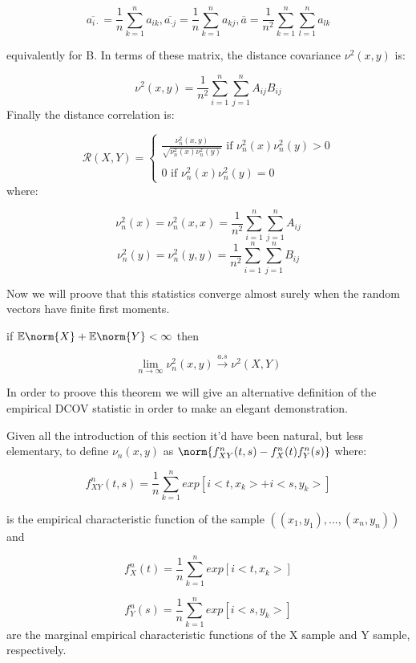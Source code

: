 $$\overline{a_{i\cdot}} = \frac{1}{n}\sum_{k=1}^{n}a_{ik},\overline{a_{\cdot j}} = \frac{1}{n}\sum_{k=1}^{n}a_{kj}, \overline{a} =  \frac{1}{n^{2}}\sum_{k=1}^{n}\sum_{l=1}^{n}a_{lk}$$

equivalently for B. In terms of these matrix, the distance covariance $\nu^{2}(x,y)$ is:

$$\nu^{2}(x,y) = \frac{1}{n^{2}}\sum_{i=1}^{n}\sum_{j=1}^{n}A_{ij}B_{ij}$$
Finally the distance correlation is:

$$
\mathcal{R}(X,Y) = \left \{
	\begin{array}{c} 
		\frac{\nu^{2}_{n}(x,y)}{\sqrt{\nu^{2}_{n}(x)\nu^{2}_{n}(y)}} \text{ if } \nu^{2}_{n}(x)\nu^{2}_{n}(y) > 0 \\ 
		\\
		0 \text{ if } \nu^{2}_{n}(x)\nu^{2}_{n}(y) = 0 
	\end{array}
	\right.  
$$
where: 

$$
\nu^{2}_{n}(x) = \nu^{2}_{n}(x,x) = \frac{1}{n^{2}}\sum_{i=1}^{n}\sum_{j=1}^{n}A_{ij}
$$
$$
\nu^{2}_{n}(y) = \nu^{2}_{n}(y,y) = \frac{1}{n^{2}}\sum_{i=1}^{n}\sum_{j=1}^{n}B_{ij}
$$

Now we will proove that this statistics converge almost surely when the random vectors have finite first moments.

\begin{thm}\label{Objective}
if $\mathbb{E}\norm{X} + \mathbb{E}\norm{Y} < \infty$ then

$$
\lim_{n\to\infty} \nu^{2}_{n}(x,y) \xrightarrow{a.s} \nu^{2}(X,Y)
$$
\end{thm}

In order to proove this theorem we will give an alternative definition of the empirical DCOV statistic in order to make an elegant demonstration.

\begin{defn}
Given all the introduction of this section it'd have been natural, but less elementary, to define $\nu_{n}(x,y)$ as $\norm{f_{XY}^{n}(t,s) - f_{X}^{n}(t)f_{Y}^{n}(s)}$ where:

$$
f_{XY}^{n}(t,s) = \frac{1}{n}\sum_{k=1}^{n}exp[i<t,x_{k}> + i<s,y_{k}>] 
$$

is the empirical characteristic function of the sample $((x_{1},y_{1}),...,(x_{n},y_{n}))$ and 

$$
f_{X}^{n}(t) = \frac{1}{n}\sum_{k=1}^{n}exp[i<t,x_{k}>]
$$

$$
f_{Y}^{n}(s) = \frac{1}{n}\sum_{k=1}^{n}exp[i<s,y_{k}>]
$$
are the marginal empirical characteristic functions of the X sample and Y sample, respectively.
\end{defn}

